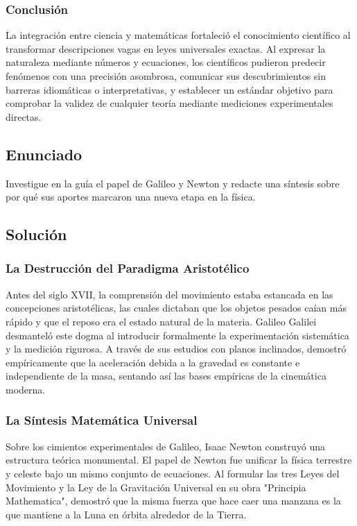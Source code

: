 \documentclass[12pt, a4paper]{article}
\begin{document}
\subsubsection*{Conclusión}
La integración entre ciencia y matemáticas fortaleció el conocimiento científico al transformar descripciones vagas en leyes universales exactas. Al expresar la naturaleza mediante números y ecuaciones, los científicos pudieron predecir fenómenos con una precisión asombrosa, comunicar sus descubrimientos sin barreras idiomáticas o interpretativas, y establecer un estándar objetivo para comprobar la validez de cualquier teoría mediante mediciones experimentales directas.

\newpage

\subsection*{Enunciado}
Investigue en la guía el papel de Galileo y Newton y redacte una síntesis sobre por qué sus aportes marcaron una nueva etapa en la física.

\subsection*{Solución}

\subsubsection*{La Destrucción del Paradigma Aristotélico}
Antes del siglo XVII, la comprensión del movimiento estaba estancada en las concepciones aristotélicas, las cuales dictaban que los objetos pesados caían más rápido y que el reposo era el estado natural de la materia. Galileo Galilei desmanteló este dogma al introducir formalmente la experimentación sistemática y la medición rigurosa. A través de sus estudios con planos inclinados, demostró empíricamente que la aceleración debida a la gravedad es constante e independiente de la masa, sentando así las bases empíricas de la cinemática moderna.

\subsubsection*{La Síntesis Matemática Universal}
Sobre los cimientos experimentales de Galileo, Isaac Newton construyó una estructura teórica monumental. El papel de Newton fue unificar la física terrestre y celeste bajo un mismo conjunto de ecuaciones. Al formular las tres Leyes del Movimiento y la Ley de la Gravitación Universal en su obra "Principia Mathematica", demostró que la misma fuerza que hace caer una manzana es la que mantiene a la Luna en órbita alrededor de la Tierra.
\end{document}
